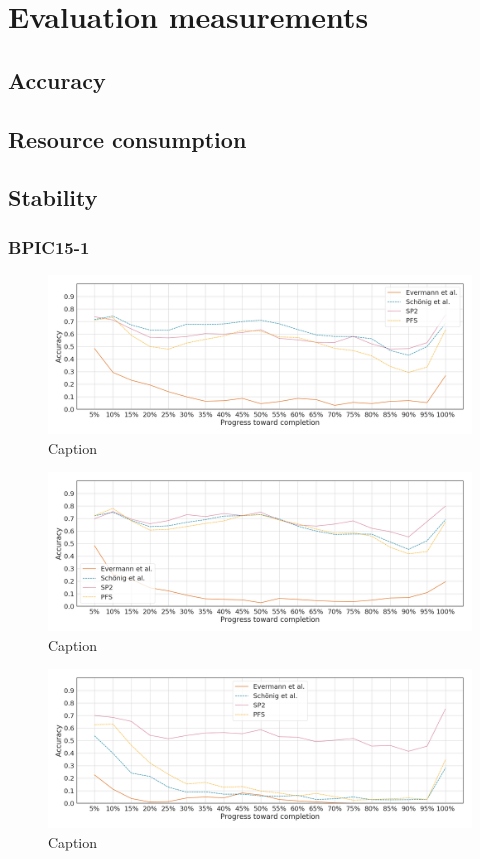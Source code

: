 \chapter{Evaluation measurements}
\section{Accuracy}
\section{Resource consumption}
\section{Stability}

\FloatBarrier
\subsection{BPIC15-1}
\begin{figure}[!htb]
    \centering
    \includegraphics[width=\textwidth]{gfx/bpic2015_1/individual_stability.png}
    \caption{Caption}
    \label{fig:my_label}
\end{figure}
\begin{figure}[!htb]
    \centering
    \includegraphics[width=\textwidth]{gfx/bpic2015_1/grouped_stability.png}
    \caption{Caption}
    \label{fig:my_label}
\end{figure}
\begin{figure}[!htb]
    \centering
    \includegraphics[width=\textwidth]{gfx/bpic2015_1/padded_stability.png}
    \caption{Caption}
    \label{fig:my_label}
\end{figure}
